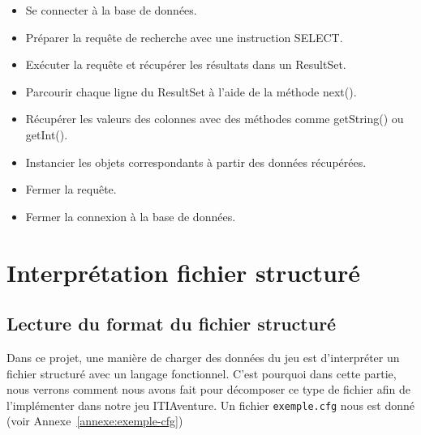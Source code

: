 \documentclass[a4paper, 12pt]{report}
\begin{document}
\begin{itemize}
  \item Se connecter à la base de données.
  
  \item Préparer la requête de recherche avec une instruction SELECT.
  
  \item Exécuter la requête et récupérer les résultats dans un ResultSet.
  
  \item Parcourir chaque ligne du ResultSet à l'aide de la méthode next().
  
  \item Récupérer les valeurs des colonnes avec des méthodes comme
getString() ou getInt().

  \item Instancier les objets correspondants à partir des données récupérées.
  
  \item Fermer la requête.
    
  \item Fermer la connexion à la base de données.
\end{itemize}

\chapter{Interprétation fichier structuré}
\section{Lecture du format du fichier structuré}

Dans ce projet, une manière de charger des données du jeu est d'interpréter un fichier structuré avec un langage fonctionnel.
C'est pourquoi dans cette partie, nous verrons comment nous avons fait pour décomposer ce type de fichier
afin de l'implémenter dans notre jeu ITIAventure. Un fichier \texttt{exemple.cfg} nous est donné (voir Annexe~\ref{annexe:exemple-cfg})
\end{document}

